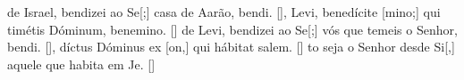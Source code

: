 {    { de Israel, bendizei ao Se[;] casa de Aarão, bendi. [\LinkPT]},
  { Levi, benedícite [mino;] qui timétis Dóminum, benemino. [\LinkLA]}%
    { de Levi, bendizei ao Se[;] vós que temeis o Senhor, bendi. [\LinkPT]},
  {díctus Dóminus ex [on,] qui hábitat \-sa\-lem. [\LinkLA]}%
    {to seja o Senhor desde Si[,] aquele que habita em Je. [\LinkPT]}
}